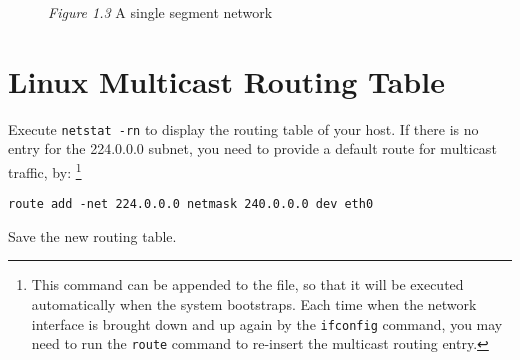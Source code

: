 \documentclass{../UTNetLab}
\begin{document}
    \begin{minipage}{0.48\textwidth}
        \begin{flushright}
            \begin{figure}[H]
                \centering
                \caption{\textit{Figure 1.3} A single segment network}
                \label{fig:fig13}
            \end{figure}
        \end{flushright}
    \end{minipage}

\section{Linux Multicast Routing Table}
\label{sec:linux-multicast-routing}
    Execute \lstinline{netstat -rn} to display the routing table of your host.
    If there is no entry for the 224.0.0.0 subnet, you need to provide a default route for multicast traffic, by:
    \footnote{This command can be appended to the  file, so that it will be executed automatically when the system bootstraps. Each time when the network interface is brought down and up again by the \lstinline{ifconfig} command, you may need to run the \lstinline{route} command to re-insert the multicast routing entry.}
    \begin{lstlisting}
route add -net 224.0.0.0 netmask 240.0.0.0 dev eth0
    \end{lstlisting}
    Save the new routing table.
    
\end{document}
